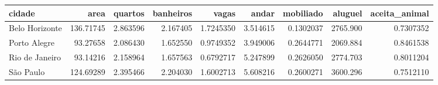 
\begin{tabular}{l|r|r|r|r|r|r|r|r}
\hline
cidade & area & quartos & banheiros & vagas & andar & mobiliado & aluguel & aceita\_animal\\
\hline
Belo Horizonte & 136.71745 & 2.863596 & 2.167405 & 1.7245350 & 3.514615 & 0.1302037 & 2765.900 & 0.7307352\\
\hline
Porto Alegre & 93.27658 & 2.086430 & 1.652550 & 0.9749352 & 3.949006 & 0.2644771 & 2069.884 & 0.8461538\\
\hline
Rio de Janeiro & 93.14216 & 2.158964 & 1.657563 & 0.6792717 & 5.247899 & 0.2626050 & 2774.703 & 0.8011204\\
\hline
São Paulo & 124.69289 & 2.395466 & 2.204030 & 1.6002713 & 5.608216 & 0.2600271 & 3600.296 & 0.7512110\\
\hline
\end{tabular}
